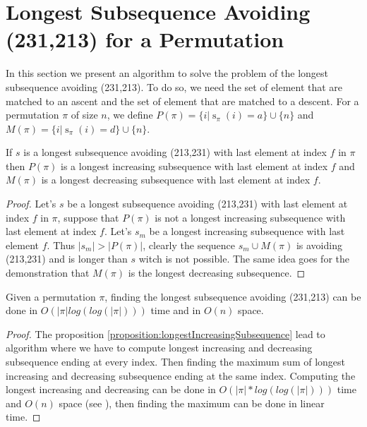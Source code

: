 \documentclass[a4paper]{llncs}
\newcommand{\ptext}{\pi}
\DeclareMathOperator{\stripea}{s}
\newcommand{\stripe}[2]{\stripea_{{#1}}({#2})}
\newcounter{num}
\newcommand{\dstep}{d}
\newcommand{\ustep}{a}
\begin{document}

\section{Longest Subsequence Avoiding \\(231,213) for a Permutation}
\label{section:LCS}

	In this section we present an algorithm to solve the problem
	of the longest subsequence avoiding (231,213).
	To do so, we need the set of element
	that are matched to an ascent and the
	set of element that are matched to a descent.
	For a permutation $\pi$ of size $n$, we define
	$P(\pi) = \{i | \stripe{\pi}{i} = \ustep \} \cup \{n\}$ and  
	$M(\pi) = \{i | \stripe{\pi}{i} = \dstep \} \cup \{n\}$.\\
	
	\begin{proposition}
	\label{proposition:longestIncreasingSubsequence}
	If $s$ is a longest subsequence avoiding (213,231) with last element at index $f$ in $\pi$ then
	$P(\pi)$ is a longest increasing subsequence with last element at index $f$ and
	$M(\pi)$ is a longest decreasing subsequence with last element at index $f$.	
	\end{proposition}
	
	\begin{proof}
	Let's $s$ be a longest subsequence avoiding (213,231) with last element at index $f$ in $\pi$, 
	suppose that $P(\pi)$ is not a longest increasing subsequence with last element at index $f$. Let's $s_m$ be a longest increasing subsequence with last element $f$.
	Thus $|s_m|>|P(\pi)|$, clearly the sequence $s_m \cup M(\pi)$
	is avoiding (213,231) and is longer than $s$ witch is not possible. 
	The same idea goes for the demonstration that $M(\pi)$ is the longest decreasing subsequence.
	\end{proof}

	\begin{proposition}
	Given a permutation $\pi$, 
	finding the longest subsequence avoiding (231,213)
	can be done in $O(|\ptext|log(log(|\ptext|)))$ time and in $O(n)$ space.	
	\end{proposition}
	
	\begin{proof}
	The proposition \ref{proposition:longestIncreasingSubsequence} lead to algorithm 
	where we have to compute longest increasing and decreasing subsequence ending at every index. Then finding the maximum sum of longest increasing and decreasing subsequence ending at the same index.
	Computing the longest increasing and decreasing can be done in $O(|\ptext|*log(log(|\ptext|)))$ time and $O(n)$ space (see \cite{Bespamyatnikh00enumeratinglongest}), then finding the maximum can be done in linear time.
	\end{proof}
\end{document}
